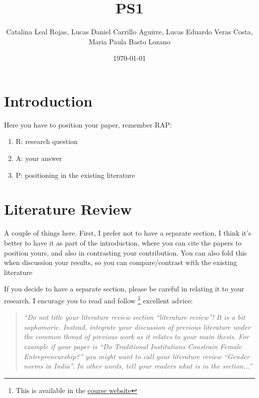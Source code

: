 \documentclass[12pt,a4paper,onecolumn]{article}
\title{PS1 }
\author{Catalina Leal Rojas, Lucas Daniel Carrillo Aguirre, Lucas Eduardo Veras Costa, Maria Paula Basto Lozano}
\date{\today}
\begin{document}
\maketitle

\thispagestyle{empty} %

%







\section{Introduction} \label{sec:intro}

Here you have to position your paper, remember RAP:
\begin{enumerate}
    \item R: research question
    \item A: your answer
    \item P: positioning in the existing literature
\end{enumerate}

\section{Literature Review}

A couple of things here. First, I prefer not to have a separate section, I think it's better to have it as part of the introduction, where you can cite the papers to position yours, and also in contrasting your contribution. You can also fold this when discussion your results, so you can compare/contrast with the existing literature


If you decide to have a separate section, please be careful in relating it to your research. I encurage you to read and follow \cite{nikolov2020writing}\footnote{This is available in the \href{https://ignaciomsarmiento.github.io/teaching/Tesis.html}{course website}} excellent advice:

\begin{quote}
    {\it ``Do not title your literature review section ``literature review''! It is a bit sophomoric. Instead, integrate your discussion of previous literature under the common thread of previous work as it relates to your main thesis.  For example if your paper is ``Do Traditional Institutions Constrain Female Entrepreneurship?'' you might want to call your literature review ``Gender norms in India''. In other words, tell your readers what is in the section...''} \citep{nikolov2020writing}
\end{quote}
\end{document}
